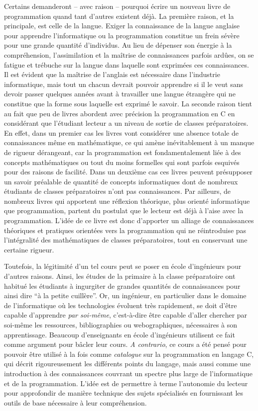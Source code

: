 \documentclass[../main.tex]{subfiles}
\begin{document}
Certains demanderont -- avec raison -- pourquoi écrire un nouveau livre de programmation quand tant d'autres existent déjà. La première raison, et la principale, est celle de la langue. Exiger la connaissance de la langue anglaise pour apprendre l'informatique ou la programmation constitue un frein sévère pour une grande quantité d'individus. Au lieu de dépenser son énergie à la compréhension, l'assimilation et la maîtrise de connaissances parfois ardûes, on se fatigue et trébuche sur la langue dans laquelle sont exprimées ces connaissances. Il est évident que la maîtrise de l'anglais est nécessaire dans l'industrie informatique, mais tout un chacun devrait pouvoir apprendre si il le veut sans devoir passer quelques années avant à travailler une langue étrangère qui ne constitue que la forme sous laquelle est exprimé le savoir. La seconde raison tient au fait que peu de livres abordent avec précision la programmation en C en considérant que l'étudiant lecteur a un niveau de sortie de classes préparatoires. En effet, dans un premier cas les livres vont considérer une absence totale de connaissances même en mathématique, ce qui amène inévitablement à un manque de rigueur dérangeant, car la programmation est fondamentalement liée à des concepts mathématiques ou tout du moins formelles qui sont parfois esquivés pour des raisons de facilité. Dans un deuxième cas ces livres peuvent présupposer un savoir préalable de quantité de concepts informatiques dont de nombreux étudiants de classes préparatoires n'ont pas connaissances. Par ailleurs, de nombreux livres qui apportent une réflexion théorique, plus orienté informatique que programmation, partent du postulat que le lecteur est déjà à l'aise avec la programmation. L'idée de ce livre est donc d'apporter un alliage de connaissances théoriques et pratiques orientées vers la programmation qui ne réintroduise pas l'intégralité des mathématiques de classes préparatoires, tout en conservant une certaine rigueur.

Toutefois, la légitimité d'un tel cours peut se poser en école d'ingénieurs pour d'autres raisons. Ainsi, les études de la primaire à la classe préparatoire ont habitué les étudiants à ingurgiter de grandes quantités de connaissances pour ainsi dire ``à la petite cuillère''. Or, un ingénieur, en particulier dans le domaine de l'informatique où les technologies évoluent très rapidement, se doit d'être capable d'apprendre \textit{par soi-même}, c'est-à-dire être capable d'aller chercher par soi-même les ressources, bibliographies ou webographiques, nécessaires à son apprentissage. Beaucoup d'enseignants en école d'ingénieurs utilisent ce fait comme argument pour bâcler leur cours. \textit{A contrario}, ce cours a été pensé pour pouvoir être utilisé à la fois comme \textit{catalogue} sur la programmation en langage C, qui décrit rigoureusement les différents points du langage, mais aussi comme une introduction à des connaissances couvrant un spectre plus large de l'informatique et de la programmation. L'idée est de permettre à terme l'autonomie du lecteur pour approfondir de manière technique des sujets spécialisés en fournissant les outils de base nécessaire à leur compréhension.
\end{document}
